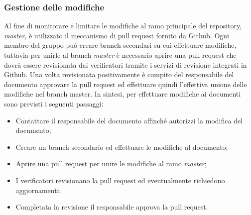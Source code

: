 	\subsubsection{Gestione delle modifiche}
		Al fine di monitorare e limitare le modifiche al ramo principale del repository\glo, \textit{master}, è utilizzato il meccanismo di pull request fornito da Github. Ogni membro del gruppo può creare branch secondari su cui effettuare modifiche, tuttavia per unirle al branch \textit{master} è necessario aprire una pull request che dovrà essere revisionata dai verificatori tramite i servizi di revisione integrati in Github. Una volta revisionata positivamente è compito del responsabile del documento approvare la pull request ed effettuare quindi l'effettiva unione delle modifiche nel branch master.
		\newline
		In sintesi, per effettuare modifiche ai documenti sono previsti i seguenti passaggi:
		\begin{itemize}
			\item Contattare il responsabile del documento affinché autorizzi la modifica del documento;
			\item Creare un branch secondario ed effettuare le modifiche al documento;
			\item Aprire una pull request per unire le modifiche al ramo \textit{master};
			\item I verificatori revisionano la pull request ed eventualmente richiedono aggiornamenti;
			\item Completata la revisione il responsabile approva la pull request.
		\end{itemize}
		
